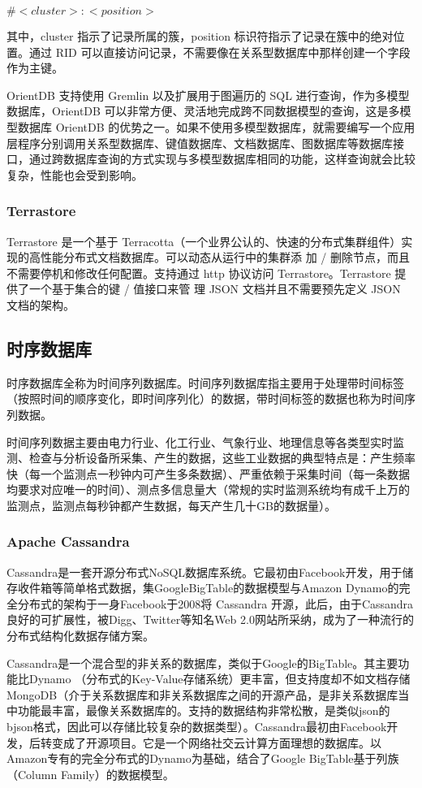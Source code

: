 \documentclass[11pt, a4paper, oneside]{ctexart}
\begin{document}
$\#<cluster>:<position>$

其中，cluster 指示了记录所属的簇，position 标识符指示了记录在簇中的绝对位置。通过 RID 可以直接访问记录，不需要像在关系型数据库中那样创建一个字段作为主键。

OrientDB 支持使用 Gremlin 以及扩展用于图遍历的 SQL 进行查询，作为多模型数据库，OrientDB 可以非常方便、灵活地完成跨不同数据模型的查询，这是多模型数据库 OrientDB 的优势之一。如果不使用多模型数据库，就需要编写一个应用层程序分别调用关系型数据库、键值数据库、文档数据库、图数据库等数据库接口，通过跨数据库查询的方式实现与多模型数据库相同的功能，这样查询就会比较复杂，性能也会受到影响。

\subsubsection{Terrastore}
Terrastore 是一个基于 Terracotta（一个业界公认的、快速的分布式集群组件）实现的高性能分布式文档数据库。可以动态从运行中的集群添 加 / 删除节点，而且不需要停机和修改任何配置。支持通过 http 协议访问 Terrastore。Terrastore 提供了一个基于集合的键 / 值接口来管 理 JSON 文档并且不需要预先定义 JSON 文档的架构。
\subsection{时序数据库}
时序数据库全称为时间序列数据库。时间序列数据库指主要用于处理带时间标签（按照时间的顺序变化，即时间序列化）的数据，带时间标签的数据也称为时间序列数据。

时间序列数据主要由电力行业、化工行业、气象行业、地理信息等各类型实时监测、检查与分析设备所采集、产生的数据，这些工业数据的典型特点是：产生频率快（每一个监测点一秒钟内可产生多条数据）、严重依赖于采集时间（每一条数据均要求对应唯一的时间）、测点多信息量大（常规的实时监测系统均有成千上万的监测点，监测点每秒钟都产生数据，每天产生几十GB的数据量）。
\subsubsection{Apache Cassandra}
Cassandra是一套开源分布式NoSQL数据库系统。它最初由Facebook开发，用于储存收件箱等简单格式数据，集GoogleBigTable的数据模型与Amazon Dynamo的完全分布式的架构于一身Facebook于2008将 Cassandra 开源，此后，由于Cassandra良好的可扩展性，被Digg、Twitter等知名Web 2.0网站所采纳，成为了一种流行的分布式结构化数据存储方案。

Cassandra是一个混合型的非关系的数据库，类似于Google的BigTable。其主要功能比Dynamo （分布式的Key-Value存储系统）更丰富，但支持度却不如文档存储MongoDB（介于关系数据库和非关系数据库之间的开源产品，是非关系数据库当中功能最丰富，最像关系数据库的。支持的数据结构非常松散，是类似json的bjson格式，因此可以存储比较复杂的数据类型）。Cassandra最初由Facebook开发，后转变成了开源项目。它是一个网络社交云计算方面理想的数据库。以Amazon专有的完全分布式的Dynamo为基础，结合了Google BigTable基于列族（Column Family）的数据模型。
\end{document}
